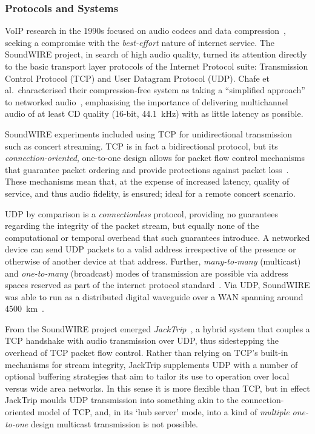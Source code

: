 \subsubsection{Protocols and Systems}\label{subsubsec:protocols-systems}

VoIP research in the 1990s focused on audio codecs and data
compression~\citep{turletti_inria_1994,hardman_successful_1998}, seeking a
compromise with the \textit{best-effort} nature of internet service.
The SoundWIRE project, in search of high audio quality, turned its attention
directly to the basic transport layer protocols of the Internet Protocol suite:
Transmission Control Protocol (TCP) and User Datagram Protocol (UDP).
Chafe et al.\ characterised their compression-free system as taking a
``simplified approach'' to networked audio~\citep{chafe_simplified_2000},
emphasising the importance of delivering multichannel audio of at least CD
quality (16-bit, \qty{44.1}{\kHz}) with as little latency as possible.

SoundWIRE experiments included using TCP for unidirectional transmission such as
concert streaming.
TCP is in fact a bidirectional protocol, but its \textit{connection-oriented},
one-to-one design allows for packet flow control mechanisms that guarantee
packet ordering and provide protections against packet
loss~\citep{schiavoni_alternatives_2013,al-dhief_performance_2018}.
These mechanisms mean that, at the expense of increased latency, quality of
service, and thus audio fidelity, is ensured; ideal for a remote concert
scenario.

UDP by comparison is a \textit{connectionless} protocol, providing no guarantees
regarding the integrity of the packet stream, but equally none of the
computational or temporal overhead that such guarantees introduce.
A networked device can send UDP packets to a valid address irrespective of the
presence or otherwise of another device at that address.
Further, \textit{many-to-many} (multicast) and \textit{one-to-many} (broadcast)
modes of transmission are possible via address spaces reserved as part of the
internet protocol standard~\citep{meyer_iana_2010}.
Via UDP, SoundWIRE was able to run as a distributed digital waveguide over a
WAN spanning around \qty{4500}{\km}~\citep{chafe_simplified_2000}.

From the SoundWIRE project emerged
\textit{JackTrip}~\citep{caceres_jacktrip_2010,caceres_jacktripsoundwire_2010},
a hybrid system that couples a TCP handshake with audio transmission over UDP,
thus sidestepping the overhead of TCP packet flow control.
Rather than relying on TCP's built-in mechanisms for stream integrity, JackTrip
supplements UDP with a number of optional buffering strategies that aim to
tailor its use to operation over local versus wide area networks.
In this sense it is more flexible than TCP, but in effect JackTrip moulds UDP
transmission into something akin to the connection-oriented model of TCP, and,
in its `hub server' mode, into a kind of \textit{multiple one-to-one} design
\textemdash{} multicast transmission is not possible.

